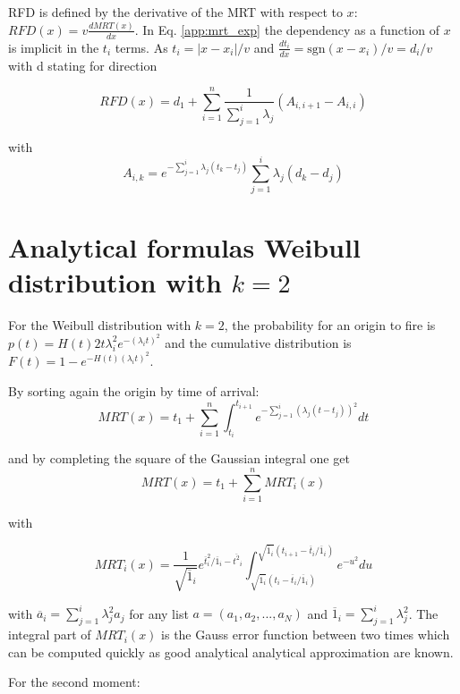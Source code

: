 \documentclass[10pt,a4paper]{revtex4-2}
\newcommand{\sign}{\text{sgn}}
\newcommand{\avgk}[1]{\overline{#1}_i}
\begin{document}
RFD is defined by the derivative of the MRT with respect to $x$: $RFD(x)=v \frac{dMRT(x)}{dx}$. In  Eq. \ref{app:mrt_exp} the dependency as a function of $x$ is implicit in the $t_i$ terms. As  $t_i=|x-x_i|/v$ and $\frac{dt_i}{dx}=\sign(x-x_i)/v=d_i/v$ with d stating for direction


\begin{equation}
RFD(x) = d_1 + \sum_{i=1}^{n}\frac{1}{\sum_{j=1}^i \lambda_j}(A_{i,i+1}-A_{i,i})
\end{equation}

with
\begin{equation}
A_{i,k} =e^{-\sum_{j=1}^i \lambda_j(t_k-t_j)} \sum_{j=1}^i \lambda_j(d_k-d_j)
\end{equation}


\section{Analytical formulas Weibull distribution with $k=2$}\label{appendix:weibull}


For the Weibull distribution with $k=2$, the probability for an origin to fire is $p(t) =  H(t)2t\lambda_i^2e^{-(\lambda_i t)^2}$
and the cumulative distribution is $F(t)=1-e^{-H(t)(\lambda_i  t)^2}$.

By sorting again the origin by time of arrival:
\begin{equation}
MRT(x) = t_1+ \sum_{i=1}^{n}\int_{t_i}^{t_{i+1}}e^{-\sum_{j=1}^i (\lambda_j(t-t_j))^2}dt
\end{equation}

and by completing the square of the Gaussian integral one get
\begin{equation}
MRT(x) = t_1 + \sum_{i=1}^{n}MRT_i(x)
\end{equation}

with 

\begin{equation}
MRT_i(x)=\frac{1}{\sqrt{\avgk 1}}e^{\avgk t ^2/\avgk 1-\avgk {t^2}}\int_{\sqrt{\avgk 1}(t_i-\avgk t /\avgk 1)}^{\sqrt{\avgk 1}(t_{i+1}-\avgk t /\avgk 1)}e^{-u^2}du
\end{equation}


with $\avgk a = \sum_{j=1}^{i}\lambda_j^2 a_j$ for any list $a=(a_1,a_2,...,a_N)$ and $\avgk 1= \sum_{j=1}^{i}\lambda_j^2$. The integral part of $MRT_i(x)$ is the Gauss error function between two times which can be computed quickly as good analytical analytical approximation are known. 

For the second moment:
\end{document}
